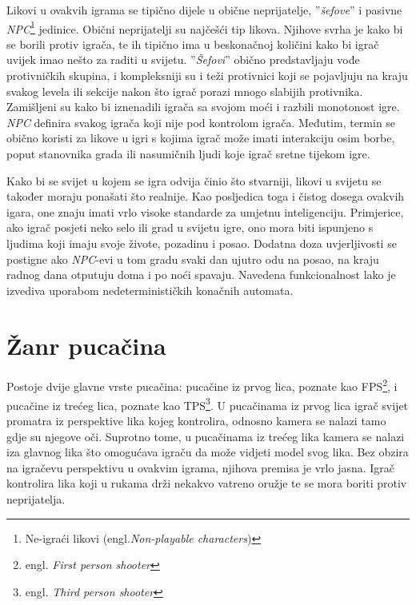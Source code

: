 \documentclass[times, utf8, zavrsni, numeric]{fer}
\begin{document}
\par Likovi u ovakvih igrama se tipično dijele u obične neprijatelje, ''\textit{šefove}'' i pasivne \textit{NPC}\footnote{Ne-igraći likovi (engl.\textit{Non-playable characters})} jedinice.
Obični neprijatelji su najčešći tip likova.
Njihove svrha je kako bi se borili protiv igrača, te ih tipično ima u beskonačnoj količini kako bi igrač uvijek imao nešto za raditi u svijetu.
''\textit{Šefovi}'' obično predstavljaju vođe protivničkih skupina, i kompleksniji su i teži protivnici koji se pojavljuju na kraju svakog levela ili sekcije nakon što igrač porazi mnogo slabijih protivnika.
Zamišljeni su kako bi iznenadili igrača sa svojom moći i razbili monotonost igre.
\textit{NPC} definira svakog igrača koji nije pod kontrolom igrača. Međutim, termin se obično koristi za likove u igri s kojima igrač može imati interakciju osim borbe, poput stanovnika grada ili nasumičnih ljudi koje igrač sretne tijekom igre.

\par Kako bi se svijet u kojem se igra odvija činio što stvarniji, likovi u svijetu se također moraju ponašati što realnije.
Kao posljedica toga i čistog dosega ovakvih igara, one znaju imati vrlo visoke standarde za umjetnu inteligenciju.
Primjerice, ako igrač posjeti neko selo ili grad u svijetu igre, ono mora biti ispunjeno s ljudima koji imaju svoje živote, pozadinu i posao.
Dodatna doza uvjerljivosti se postigne ako \textit{NPC}-evi u tom gradu svaki dan ujutro odu na posao, na kraju radnog dana otputuju doma i po noći spavaju.
Navedena funkcionalnost lako je izvediva uporabom nedeterminističkih konačnih automata\cite{book:AIGameProgrammingWisdom}.

\section{Žanr pucačina}

\par Postoje dvije glavne vrste pucačina: pucačine iz prvog lica, poznate kao FPS\footnote{engl. \textit{First person shooter}}, i pucačine iz trećeg lica, poznate kao TPS\footnote{engl. \textit{Third person shooter}}.
U pucačinama iz prvog lica igrač svijet promatra iz perspektive lika kojeg kontrolira, odnosno kamera se nalazi tamo gdje su njegove oči.
Suprotno tome, u pucačinama iz trećeg lika kamera se nalazi iza glavnog lika što omogućava igraču da može vidjeti model svog lika.
Bez obzira na igračevu perspektivu u ovakvim igrama, njihova premisa je vrlo jasna.
Igrač kontrolira lika koji u rukama drži nekakvo vatreno oružje te se mora boriti protiv neprijatelja.
\end{document}
